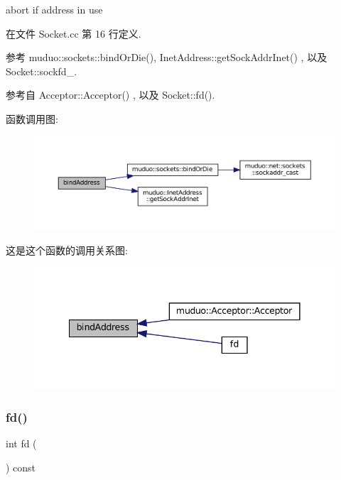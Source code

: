 abort if address in use 



在文件 Socket.\+cc 第 16 行定义.



参考 muduo\+::sockets\+::bind\+Or\+Die(), Inet\+Address\+::get\+Sock\+Addr\+Inet() , 以及 Socket\+::sockfd\+\_\+.



参考自 Acceptor\+::\+Acceptor() , 以及 Socket\+::fd().

函数调用图\+:
\nopagebreak
\begin{figure}[H]
\begin{center}
\leavevmode
\includegraphics[width=350pt]{classmuduo_1_1Socket_a5676ae95e49d9927ccf9cf7255521689_cgraph}
\end{center}
\end{figure}
这是这个函数的调用关系图\+:
\nopagebreak
\begin{figure}[H]
\begin{center}
\leavevmode
\includegraphics[width=341pt]{classmuduo_1_1Socket_a5676ae95e49d9927ccf9cf7255521689_icgraph}
\end{center}
\end{figure}
\mbox{\label{classmuduo_1_1Socket_ace5c4071ee8893901bb818bbcab739b2}} 
\subsubsection{\texorpdfstring{fd()}{fd()}}
{\footnotesize\ttfamily int fd (\begin{DoxyParamCaption}{ }\end{DoxyParamCaption}) const\hspace{0.3cm}{\ttfamily [inline]}}



